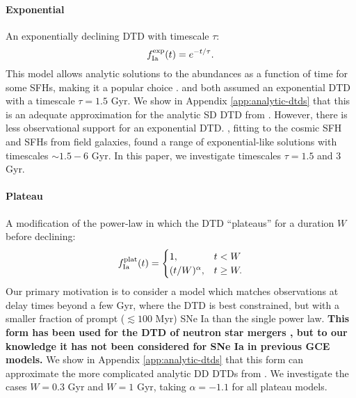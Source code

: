 \documentclass[twocolumn,twocolappendix,linenumbers]{aastex631}
\begin{document}
\paragraph{Exponential} An exponentially declining DTD with timescale $\tau$:
\begin{equation}
    f_{\rm Ia}^{\rm exp}(t) = e^{-t/\tau}.
    \label{eq:exponential-dtd}
\end{equation}
This model allows analytic solutions to the abundances as a function of time for some SFHs, making it a popular choice {\bf \citep[e.g.,][]{Weinberg2017-ChemicalEquilibrium,Pantoni2019-AnalyticSolutions,Palicio2023-AnalyticDTD}}. \citet{Schonrich2009-RadialMixing} and \citet{Weinberg2017-ChemicalEquilibrium} both assumed an exponential DTD with a timescale $\tau=1.5$ Gyr. We show in Appendix \ref{app:analytic-dtds} that this is an adequate approximation for the analytic SD DTD from \citet{Greggio2005-AnalyticalRates}. However, there is less observational support for an exponential DTD. \citet{Strolger2020-ExponentialDTD}, fitting to the cosmic SFH and SFHs from field galaxies, found a range of exponential-like solutions with timescales $\sim 1.5 - 6$ Gyr.
In this paper, we investigate timescales $\tau=1.5$ and 3 Gyr.

\paragraph{Plateau} A modification of the power-law in which the DTD ``plateaus'' for a duration $W$ before declining:
\begin{equation}
    f_{\rm Ia}^{\rm plat}(t) =
    \begin{cases}
        1, & t < W \\
        (t/W)^\alpha, & t \ge W.
    \end{cases}
    \label{eq:plateau-dtd}
\end{equation}
Our primary motivation is to consider a model which matches observations at delay times beyond a few Gyr, where the DTD is best constrained, but with a smaller fraction of prompt ($\lesssim 100$ Myr) SNe Ia than the single power law. {\bf This form has been used for the DTD of neutron star mergers \citep{Simonetti2019-NeutronStarDTD}, but to our knowledge it has not been considered for SNe Ia in previous GCE models.}
We show in Appendix \ref{app:analytic-dtds} that this form can approximate the more complicated analytic DD DTDs from \citet{Greggio2005-AnalyticalRates}. We investigate the cases $W=0.3$ Gyr and $W=1$ Gyr, taking $\alpha=-1.1$ for all plateau models.
\end{document}
